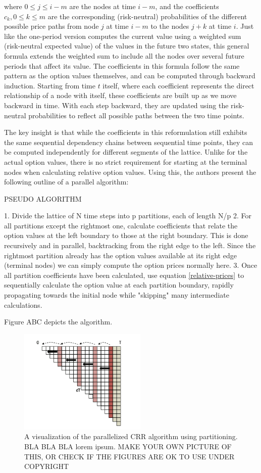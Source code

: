\documentclass[english,12pt,a4paper,pdftex,sci,utf8]{aaltothesis}
\begin{document}
where $0 \leq j \leq i-m$ are the nodes at time $i-m$, and the coefficients $c_k, 0 \leq k \leq m$ are the corresponding (risk-neutral) probabilities of the different possible price paths from node $j$ at time $i-m$ to the nodes $j+k$ at time $i$. Just like the one-period version computes the current value using a weighted sum (risk-neutral expected value) of the values in the future two states, this general formula extends the weighted sum to include all the nodes over several future periods that affect its value. The coefficients in this formula follow the same pattern as the option values themselves, and can be computed through backward induction. Starting from time $t$ itself, where each coefficient represents the direct relationship of a node with itself, these coefficients are built up as we move backward in time. With each step backward, they are updated using the risk-neutral probabilities to reflect all possible paths between the two time points.

The key insight is that while the coefficients in this reformulation still exhibits the same sequential dependency chains between sequential time points, they can be computed independently for different segments of the lattice. Unlike for the actual option values, there is no strict requirement for starting at the terminal nodes when calculating relative option values. Using this, the authors present the following outline of a parallel algorithm:

PSEUDO ALGORITHM

1. Divide the lattice of N time steps into p partitions, each of length N/p
2. For all partitions except the rightmost one, calculate coefficients that relate the option values at the left boundary to those at the right boundary. This is done recursively and in parallel, backtracking from the right edge to the left. Since the rightmost partition already has the option values available at its right edge (terminal nodes) we can simply compute the option prices normally here.
3. Once all partition coefficients have been calculated, use equation \eqref{relative-prices} to sequentially calculate the option value at each partition boundary, rapidly propagating towards the initial node while "skipping" many intermediate calculations.

Figure ABC depicts the algorithm.


\begin{figure}[h]
    \centering
    \includegraphics[height=5cm]{CRRpartitioned.png}
    \caption{A visualization of the parallelized CRR algorithm using partitioning. BLA BLA BLA lorem ipsum. MAKE YOUR OWN PICTURE OF THIS, OR CHECK IF THE FIGURES ARE OK TO USE UNDER COPYRIGHT}
    \label{fig:combined}
\end{figure}
\end{document}
